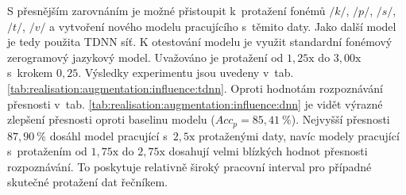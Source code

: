


S přesnějším zarovnáním je možné přistoupit  k~protažení fonémů $/k/$, $/p/$, $/s/$, $/t/$, $/v/$ a vytvoření nového modelu pracujícího s~těmito daty.
Jako další model je tedy použita TDNN síť.
K otestování modelu je využit standardní fonémový zerogramový jazykový model.
Uvažováno je protažení od $1,25\mathrm{x}$ do $3,00\mathrm{x}$ s~krokem $0,25$. Výsledky experimentu jsou uvedeny v~tab. \ref{tab:realisation:augmentation:influence:tdnn}.
Oproti hodnotám rozpoznávání přesnosti v~tab. \ref{tab:realisation:augmentation:influence:dnn} je vidět výrazné zlepšení přesnosti oproti baselinu modelu ($Acc_{p} = 85,41~\%$).
Nejvyšší přesnosti $87,90~\%$ dosáhl model pracující s~$2,5\mathrm{x}$ protaženými daty, navíc modely pracující s~protažením od $1,75\mathrm{x}$ do $2,75\mathrm{x}$ dosahují velmi blízkých hodnot přesnosti rozpoznávání.
To poskytuje relativně široký pracovní interval pro případné skutečné protažení dat řečníkem.

